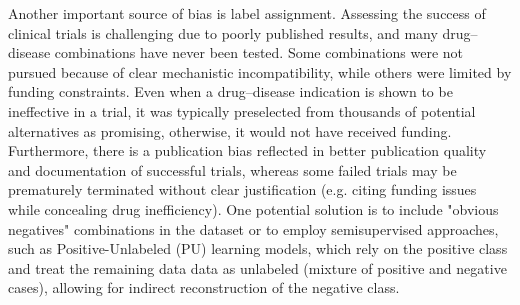 Another important source of bias is label assignment. Assessing the success of clinical trials is challenging due to poorly published 
results, and many drug--disease combinations have never been tested. 
Some combinations were not pursued because of clear
 mechanistic incompatibility, while others were limited by funding constraints.
 Even when a drug--disease indication is shown to be ineffective in a trial, it was typically preselected 
 from thousands of potential alternatives as promising, otherwise, it would not have received funding.
  Furthermore, there is a publication bias reflected in
 better publication quality and documentation of successful trials, whereas some failed 
 trials may be prematurely terminated without clear justification (e.g. citing funding issues while
 concealing drug inefficiency).
 One potential solution is to include "obvious negatives" combinations in the dataset or to
  employ semisupervised approaches, such as Positive-Unlabeled (PU) learning models, 
 which rely on the positive class and treat the remaining data data as unlabeled (mixture of positive and negative cases),
  allowing for indirect reconstruction of the negative class.



